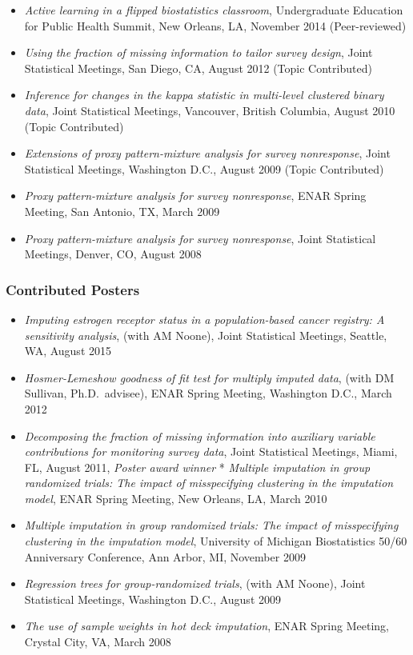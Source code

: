 \documentclass[
  english,
  letterpaper,
  DIV=11,
  numbers=noendperiod]{scrartcl}
\providecommand{\tightlist}{%
  \setlength{\itemsep}{0pt}\setlength{\parskip}{0pt}}
\begin{document}
\begin{itemize}
  Statistical Meetings, Chicago, IL, August 2016 (Topic Contributed)
\item
  \emph{Active learning in a flipped biostatistics classroom},
  Undergraduate Education for Public Health Summit, New Orleans, LA,
  November 2014 (Peer-reviewed)
\item
  \emph{Using the fraction of missing information to tailor survey
  design}, Joint Statistical Meetings, San Diego, CA, August 2012 (Topic
  Contributed)
\item
  \emph{Inference for changes in the kappa statistic in multi-level
  clustered binary data}, Joint Statistical Meetings, Vancouver, British
  Columbia, August 2010 (Topic Contributed)
\item
  \emph{Extensions of proxy pattern-mixture analysis for survey
  nonresponse}, Joint Statistical Meetings, Washington D.C., August 2009
  (Topic Contributed)
\item
  \emph{Proxy pattern-mixture analysis for survey nonresponse}, ENAR
  Spring Meeting, San Antonio, TX, March 2009
\item
  \emph{Proxy pattern-mixture analysis for survey nonresponse}, Joint
  Statistical Meetings, Denver, CO, August 2008
\end{itemize}

\subsubsection{Contributed Posters}\label{contributed-posters}

\begin{itemize}
\tightlist
\item
  \emph{Imputing estrogen receptor status in a population-based cancer
  registry: A sensitivity analysis}, (with AM Noone), Joint Statistical
  Meetings, Seattle, WA, August 2015
\item
  \emph{Hosmer-Lemeshow goodness of fit test for multiply imputed data},
  (with DM Sullivan, Ph.D.~advisee), ENAR Spring Meeting, Washington
  D.C., March 2012
\item
  \emph{Decomposing the fraction of missing information into auxiliary
  variable contributions for monitoring survey data}, Joint Statistical
  Meetings, Miami, FL, August 2011, \emph{Poster award winner} *
  \emph{Multiple imputation in group randomized trials: The impact of
  misspecifying clustering in the imputation model}, ENAR Spring
  Meeting, New Orleans, LA, March 2010
\item
  \emph{Multiple imputation in group randomized trials: The impact of
  misspecifying clustering in the imputation model}, University of
  Michigan Biostatistics 50/60 Anniversary Conference, Ann Arbor, MI,
  November 2009
\item
  \emph{Regression trees for group-randomized trials}, (with AM Noone),
  Joint Statistical Meetings, Washington D.C., August 2009
\item
  \emph{The use of sample weights in hot deck imputation}, ENAR Spring
  Meeting, Crystal City, VA, March 2008
\end{itemize}
\end{document}
